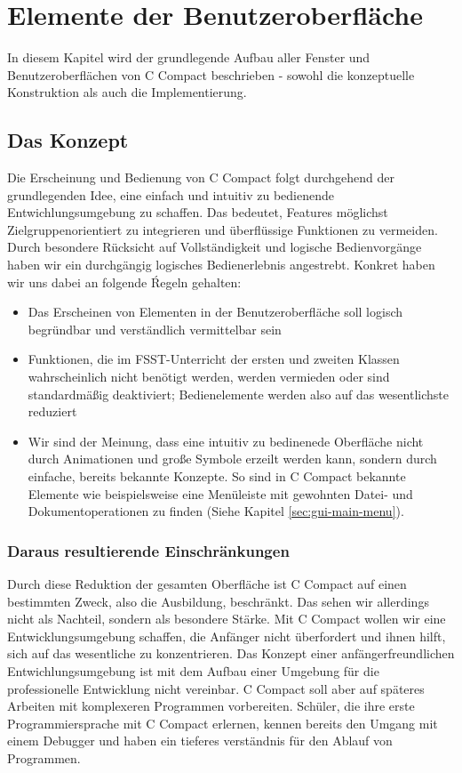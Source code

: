 

\chapter{Elemente der Benutzeroberfläche}
In diesem Kapitel wird der grundlegende Aufbau aller Fenster und Benutzeroberflächen von C Compact beschrieben - sowohl die konzeptuelle Konstruktion als auch die Implementierung.
\section{Das Konzept}
Die Erscheinung und Bedienung von C Compact folgt durchgehend der grundlegenden Idee, eine einfach und intuitiv zu bedienende Entwichlungsumgebung zu schaffen. Das bedeutet, Features möglichst Zielgruppenorientiert zu integrieren und überflüssige Funktionen zu vermeiden. Durch besondere Rücksicht auf Vollständigkeit und logische Bedienvorgänge haben wir ein durchgängig logisches Bedienerlebnis angestrebt.
Konkret haben wir uns dabei an folgende Ŕegeln gehalten:
\begin{itemize}
\item Das Erscheinen von Elementen in der Benutzeroberfläche soll logisch begründbar und verständlich vermittelbar sein
\item Funktionen, die im FSST-Unterricht der ersten und zweiten Klassen wahrscheinlich nicht benötigt werden, werden vermieden oder sind standardmäßig deaktiviert; Bedienelemente werden also auf das wesentlichste reduziert
\item Wir sind der Meinung, dass eine intuitiv zu bedinenede Oberfläche nicht durch Animationen und große Symbole erzeilt werden kann, sondern durch einfache, bereits bekannte Konzepte. So sind in C Compact bekannte Elemente wie beispielsweise eine Menüleiste mit gewohnten Datei- und Dokumentoperationen zu finden (Siehe Kapitel \ref{sec:gui-main-menu}).
\end{itemize}

\subsection{Daraus resultierende Einschränkungen}
Durch diese Reduktion der gesamten Oberfläche ist C Compact auf einen bestimmten Zweck, also die Ausbildung, beschränkt. Das sehen wir allerdings nicht als Nachteil, sondern als besondere Stärke. Mit C Compact wollen wir eine Entwicklungsumgebung schaffen, die Anfänger nicht überfordert und ihnen hilft, sich auf das wesentliche zu konzentrieren.
Das Konzept einer anfängerfreundlichen Entwichlungsumgebung ist mit dem Aufbau einer Umgebung für die professionelle Entwicklung nicht vereinbar. C Compact soll aber auf späteres Arbeiten mit komplexeren Programmen vorbereiten. Schüler, die ihre erste Programmiersprache mit C Compact erlernen, kennen bereits den Umgang mit einem Debugger und haben ein tieferes verständnis für den Ablauf von Programmen.

